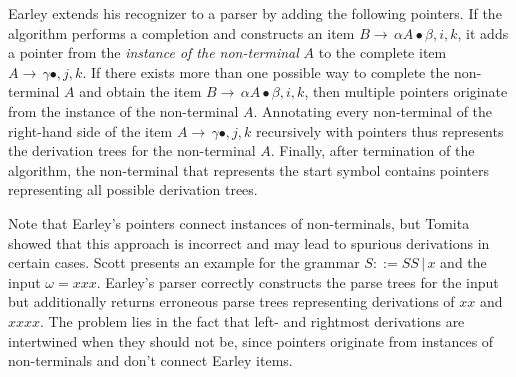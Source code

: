 \begin{isabellebody}
\begin{isamarkuptext}
Earley \cite{Earley:1970} extends his recognizer to a parser by adding the following
pointers. If the algorithm performs a completion and constructs an item $B \rightarrow \, \alpha A \bullet \beta, i, k$,
it adds a pointer from the \textit{instance of the non-terminal} $A$ to the complete item
$A \rightarrow \, \gamma \bullet, j, k$. If there exists more than one possible way to complete the non-terminal
$A$ and obtain the item $B \rightarrow \, \alpha A \bullet \beta, i, k$, then multiple pointers originate
from the instance of the non-terminal $A$. Annotating every non-terminal of the right-hand side of the item
$A \rightarrow \, \gamma \bullet, j, k$ recursively with pointers thus represents the derivation trees for
the non-terminal $A$. Finally, after termination of the algorithm, the non-terminal that represents the start symbol
contains pointers representing all possible derivation trees.

Note that Earley's pointers connect instances of non-terminals, but Tomita \cite{Tomita:1985} showed
that this approach is incorrect and may lead to spurious derivations in certain cases. Scott \cite{Scott:2008}
presents an example for the grammar $S ::= SS \, | \, x$ and the input $\omega = xxx$. Earley's parser
correctly constructs the parse trees for the input but additionally returns erroneous parse trees representing
derivations of $xx$ and $xxxx$. The problem lies in the fact that left- and rightmost derivations are
intertwined when they should not be, since pointers originate from instances of non-terminals and don't
connect Earley items.


\end{isamarkuptext}
\end{isabellebody}
